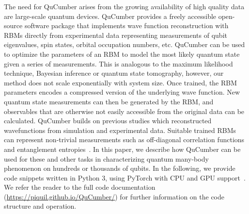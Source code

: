 \documentclass[submission, Phys]{SciPost}
\begin{document}
The need for QuCumber arises from the growing availability of high quality data are large-scale quantum devices. 
QuCumber provides a freely accessible open-source software package that implements wave function reconstruction with RBMs directly from experimental data representing measurements of qubit eigenvalues, spin states, orbital occupation numbers, etc.
QuCumber can be used to optimize the parameters of an RBM to model the most likely quantum state given a series of measurements.
This is analogous to the maximum likelihood technique, Bayesian inference or quantum state tomography, 
however, our method does not scale exponentially with system size.
Once trained, the RBM parameters encodes a compressed version of the underlying wave function.
New quantum state measurements can then be generated by the RBM, and observables that are otherwise not easily accessible from the original data can be calculated. 
QuCumber builds on previous studies which reconstructed wavefunctions from simulation and experimental data. Suitable trained RBMs can represent non-trivial measurements such as off-diagonal correlation functions and entanglement entropies~\cite{Torlai2016thermo, torlai2018tomography}.
In this paper, we describe how QuCumber can be used for these and other tasks in characterizing quantum many-body phenomenon on hundreds or thousands of qubits.
In the following, we provide code snippets written in Python 3, using PyTorch with CPU and GPU support~\cite{paszke2017automatic}.
We refer the reader to the full code documentation (\url{https://piquil.github.io/QuCumber/}) for further information on the code structure and operation.



\end{document}
